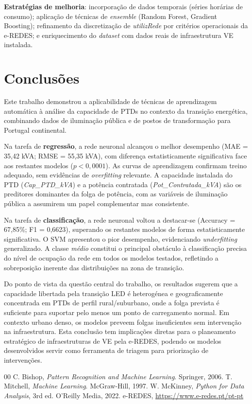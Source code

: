 \documentclass[conference]{IEEEtran}
\begin{document}
\textbf{Estratégias de melhoria}: incorporação de dados temporais (séries horárias de consumo); aplicação de técnicas de \textit{ensemble} (Random Forest, Gradient Boosting); refinamento da discretização de \textit{utilizRede} por critérios operacionais da e-REDES; e enriquecimento do \textit{dataset} com dados reais de infraestrutura VE instalada.

\section{Conclusões}

Este trabalho demonstrou a aplicabilidade de técnicas de aprendizagem automática à análise da capacidade de PTDs no contexto da transição energética, combinando dados de iluminação pública e de postos de transformação para Portugal continental.

Na tarefa de \textbf{regressão}, a rede neuronal alcançou o melhor desempenho (MAE = 35,42 kVA; RMSE = 55,35 kVA), com diferença estatisticamente significativa face aos restantes modelos ($p < 0,0001$). As curvas de aprendizagem confirmam treino adequado, sem evidências de \textit{overfitting} relevante. A capacidade instalada do PTD (\textit{Cap\_PTD\_kVA}) e a potência contratada (\textit{Pot\_Contratada\_kVA}) são os preditores dominantes da folga de potência, com as variáveis de iluminação pública a assumirem um papel complementar mas consistente.

Na tarefa de \textbf{classificação}, a rede neuronal voltou a destacar-se (Accuracy = 67,85\%; F1 = 0,6623), superando os restantes modelos de forma estatisticamente significativa. O SVM apresentou o pior desempenho, evidenciando \textit{underfitting} generalizado. A classe \textit{médio} constitui o principal obstáculo à classificação precisa do nível de ocupação da rede em todos os modelos testados, refletindo a sobreposição inerente das distribuições na zona de transição.

Do ponto de vista da questão central do trabalho, os resultados sugerem que a capacidade libertada pela transição LED é heterogénea e geograficamente concentrada em PTDs de perfil rural/suburbano, onde a folga prevista é suficiente para suportar pelo menos um ponto de carregamento normal. Em contexto urbano denso, os modelos preveem folgas insuficientes sem intervenção na infraestrutura. Esta conclusão tem implicações diretas para o planeamento estratégico de infraestruturas de VE pela e-REDES, podendo os modelos desenvolvidos servir como ferramenta de triagem para priorização de intervenções.

\begin{thebibliography}{00}
 C. Bishop, \textit{Pattern Recognition and Machine Learning}. Springer, 2006.
 T. Mitchell, \textit{Machine Learning}. McGraw-Hill, 1997.
 W. McKinney, \textit{Python for Data Analysis}, 3rd ed. O'Reilly Media, 2022.
 e-REDES, \url{https://www.e-redes.pt/pt-pt}
\end{thebibliography}
\end{document}
